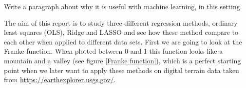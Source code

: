 \thispagestyle{plain}

Write a paragraph about why it is useful with machine learning, in this setting.

\noindent The aim of this report is to study three different regression methods, ordinary least squares (OLS), Ridge and LASSO and see how these method compare to each other when applied to different data sets. First we are going to look at the Franke function. When plotted between 0 and 1 this function looks like a mountain and a valley (see figure \eqref{Franke function}), which is a perfect starting point when we later want to apply these methods on digital terrain data taken from \url{https://earthexplorer.usgs.gov/}.
